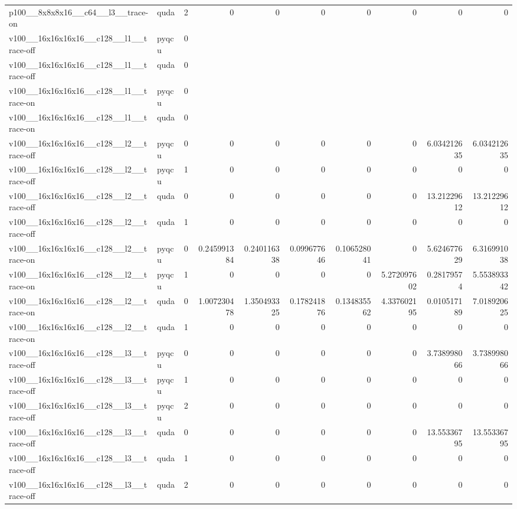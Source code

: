 \begin{table}[htbp]
\begin{tabular}{@{}llrrrrrrrr@{}}
p100\_\_8x8x8x16\_\_c64\_\_l3\_\_trace-on & quda & 2 & 0 & 0 & 0 & 0 & 0 & 0 & 0 \\
v100\_\_16x16x16x16\_\_c128\_\_l1\_\_trace-off & pyqcu & 0 &  &  &  &  &  &  &  \\
v100\_\_16x16x16x16\_\_c128\_\_l1\_\_trace-off & quda & 0 &  &  &  &  &  &  &  \\
v100\_\_16x16x16x16\_\_c128\_\_l1\_\_trace-on & pyqcu & 0 &  &  &  &  &  &  &  \\
v100\_\_16x16x16x16\_\_c128\_\_l1\_\_trace-on & quda & 0 &  &  &  &  &  &  &  \\
v100\_\_16x16x16x16\_\_c128\_\_l2\_\_trace-off & pyqcu & 0 & 0 & 0 & 0 & 0 & 0 & 6.034212635 & 6.034212635 \\
v100\_\_16x16x16x16\_\_c128\_\_l2\_\_trace-off & pyqcu & 1 & 0 & 0 & 0 & 0 & 0 & 0 & 0 \\
v100\_\_16x16x16x16\_\_c128\_\_l2\_\_trace-off & quda & 0 & 0 & 0 & 0 & 0 & 0 & 13.21229612 & 13.21229612 \\
v100\_\_16x16x16x16\_\_c128\_\_l2\_\_trace-off & quda & 1 & 0 & 0 & 0 & 0 & 0 & 0 & 0 \\
v100\_\_16x16x16x16\_\_c128\_\_l2\_\_trace-on & pyqcu & 0 & 0.245991384 & 0.240116338 & 0.099677646 & 0.106528041 & 0 & 5.624677629 & 6.316991038 \\
v100\_\_16x16x16x16\_\_c128\_\_l2\_\_trace-on & pyqcu & 1 & 0 & 0 & 0 & 0 & 5.272097602 & 0.28179574 & 5.553893342 \\
v100\_\_16x16x16x16\_\_c128\_\_l2\_\_trace-on & quda & 0 & 1.007230478 & 1.350493325 & 0.178241876 & 0.134835562 & 4.337602195 & 0.010517189 & 7.018920625 \\
v100\_\_16x16x16x16\_\_c128\_\_l2\_\_trace-on & quda & 1 & 0 & 0 & 0 & 0 & 0 & 0 & 0 \\
v100\_\_16x16x16x16\_\_c128\_\_l3\_\_trace-off & pyqcu & 0 & 0 & 0 & 0 & 0 & 0 & 3.738998066 & 3.738998066 \\
v100\_\_16x16x16x16\_\_c128\_\_l3\_\_trace-off & pyqcu & 1 & 0 & 0 & 0 & 0 & 0 & 0 & 0 \\
v100\_\_16x16x16x16\_\_c128\_\_l3\_\_trace-off & pyqcu & 2 & 0 & 0 & 0 & 0 & 0 & 0 & 0 \\
v100\_\_16x16x16x16\_\_c128\_\_l3\_\_trace-off & quda & 0 & 0 & 0 & 0 & 0 & 0 & 13.55336795 & 13.55336795 \\
v100\_\_16x16x16x16\_\_c128\_\_l3\_\_trace-off & quda & 1 & 0 & 0 & 0 & 0 & 0 & 0 & 0 \\
v100\_\_16x16x16x16\_\_c128\_\_l3\_\_trace-off & quda & 2 & 0 & 0 & 0 & 0 & 0 & 0 & 0 \\

\end{tabular}
\end{table}
